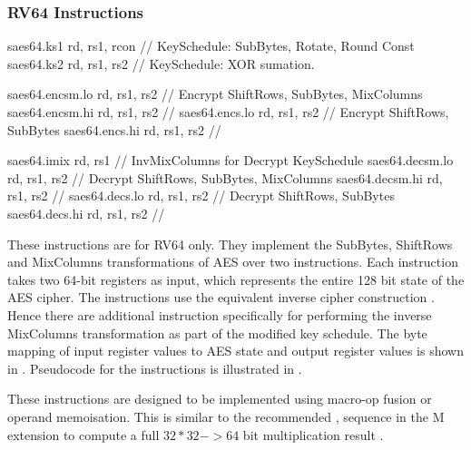 
\newpage
\subsubsection{RV64 Instructions}

\begin{cryptoisa}
saes64.ks1      rd, rs1, rcon  // KeySchedule: SubBytes, Rotate, Round Const
saes64.ks2      rd, rs1, rs2   // KeySchedule: XOR sumation.

saes64.encsm.lo rd, rs1, rs2   // Encrypt ShiftRows, SubBytes, MixColumns
saes64.encsm.hi rd, rs1, rs2   //
saes64.encs.lo  rd, rs1, rs2   // Encrypt ShiftRows, SubBytes
saes64.encs.hi  rd, rs1, rs2   //

saes64.imix     rd, rs1        // InvMixColumns for Decrypt KeySchedule
saes64.decsm.lo rd, rs1, rs2   // Decrypt ShiftRows, SubBytes, MixColumns
saes64.decsm.hi rd, rs1, rs2   //
saes64.decs.lo  rd, rs1, rs2   // Decrypt ShiftRows, SubBytes
saes64.decs.hi  rd, rs1, rs2   //
\end{cryptoisa}

These instructions are for RV64 only.
They implement the SubBytes, ShiftRows and MixColumns transformations of AES
over two instructions.
Each instruction takes two 64-bit registers as input, which represents
the entire 128 bit state of the AES cipher.
The instructions use the equivalent inverse cipher construction
\cite[Page 23, Section 5.3.5]{nist:fips:197}.
Hence there are additional instruction specifically for performing the
inverse MixColumns transformation as part of the modified key schedule.
The byte mapping of input register values to AES state and output register
values is shown in .
Pseudocode for the instructions is illustrated in
.

These instructions are designed to be implemented using macro-op fusion or
operand memoisation.
This is similar to the recommended , 
sequence in the M extension to compute a full $32*32->64$ bit
multiplication result \cite[Section 7.1]{riscv:spec:user}.

